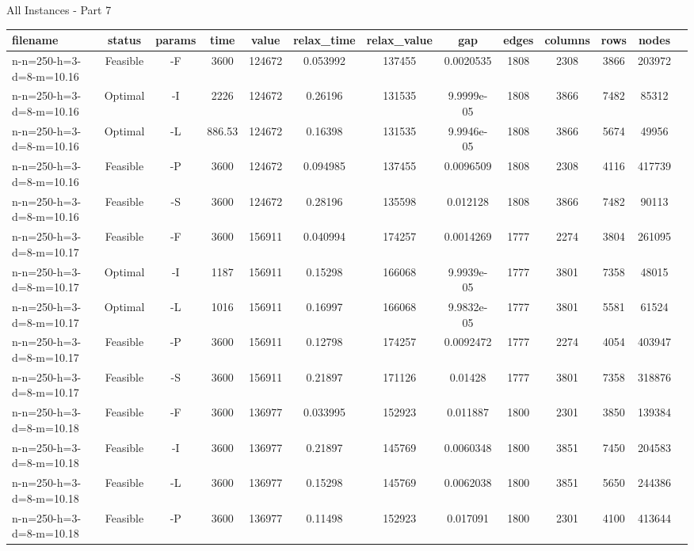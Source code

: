 \documentclass[landscape, a4paper]{article}
\begin{document}
\begin{center}
All Instances - Part 7

\begin{tabular}{lcccccccccccc}
filename & status & params & time & value & relax\_time & relax\_value & gap & edges & columns & rows & nodes & \\
\hline
n-n=250-h=3-d=8-m=10.16 & Feasible & -F & 3600 & 124672 & 0.053992 & 137455 & 0.0020535 & 1808 & 2308 & 3866 & 203972 & \\
n-n=250-h=3-d=8-m=10.16 & Optimal & -I & 2226 & 124672 & 0.26196 & 131535 & 9.9999e-05 & 1808 & 3866 & 7482 & 85312 & \\
n-n=250-h=3-d=8-m=10.16 & Optimal & -L & 886.53 & 124672 & 0.16398 & 131535 & 9.9946e-05 & 1808 & 3866 & 5674 & 49956 & \\
n-n=250-h=3-d=8-m=10.16 & Feasible & -P & 3600 & 124672 & 0.094985 & 137455 & 0.0096509 & 1808 & 2308 & 4116 & 417739 & \\
n-n=250-h=3-d=8-m=10.16 & Feasible & -S & 3600 & 124672 & 0.28196 & 135598 & 0.012128 & 1808 & 3866 & 7482 & 90113 & \\
n-n=250-h=3-d=8-m=10.17 & Feasible & -F & 3600 & 156911 & 0.040994 & 174257 & 0.0014269 & 1777 & 2274 & 3804 & 261095 & \\
n-n=250-h=3-d=8-m=10.17 & Optimal & -I & 1187 & 156911 & 0.15298 & 166068 & 9.9939e-05 & 1777 & 3801 & 7358 & 48015 & \\
n-n=250-h=3-d=8-m=10.17 & Optimal & -L & 1016 & 156911 & 0.16997 & 166068 & 9.9832e-05 & 1777 & 3801 & 5581 & 61524 & \\
n-n=250-h=3-d=8-m=10.17 & Feasible & -P & 3600 & 156911 & 0.12798 & 174257 & 0.0092472 & 1777 & 2274 & 4054 & 403947 & \\
n-n=250-h=3-d=8-m=10.17 & Feasible & -S & 3600 & 156911 & 0.21897 & 171126 & 0.01428 & 1777 & 3801 & 7358 & 318876 & \\
n-n=250-h=3-d=8-m=10.18 & Feasible & -F & 3600 & 136977 & 0.033995 & 152923 & 0.011887 & 1800 & 2301 & 3850 & 139384 & \\
n-n=250-h=3-d=8-m=10.18 & Feasible & -I & 3600 & 136977 & 0.21897 & 145769 & 0.0060348 & 1800 & 3851 & 7450 & 204583 & \\
n-n=250-h=3-d=8-m=10.18 & Feasible & -L & 3600 & 136977 & 0.15298 & 145769 & 0.0062038 & 1800 & 3851 & 5650 & 244386 & \\
n-n=250-h=3-d=8-m=10.18 & Feasible & -P & 3600 & 136977 & 0.11498 & 152923 & 0.017091 & 1800 & 2301 & 4100 & 413644 & \\

\end{tabular}
\end{center}
\end{document}

